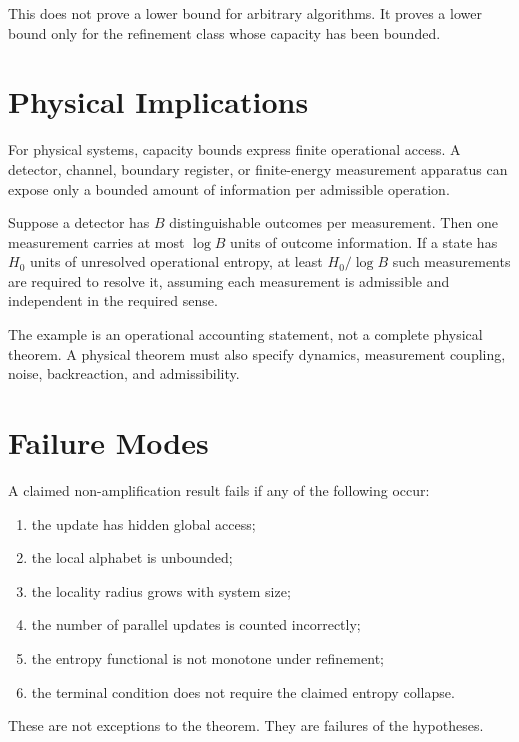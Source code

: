 This does not prove a lower bound for arbitrary algorithms. It proves a lower
bound only for the refinement class whose capacity has been bounded.

\section{Physical Implications}

For physical systems, capacity bounds express finite operational access. A
detector, channel, boundary register, or finite-energy measurement apparatus
can expose only a bounded amount of information per admissible operation.

\begin{example}
Suppose a detector has \(B\) distinguishable outcomes per measurement. Then
one measurement carries at most \(\log B\) units of outcome information. If a
state has \(H_0\) units of unresolved operational entropy, at least
\(H_0/\log B\) such measurements are required to resolve it, assuming each
measurement is admissible and independent in the required sense.
\end{example}

The example is an operational accounting statement, not a complete physical
theorem. A physical theorem must also specify dynamics, measurement coupling,
noise, backreaction, and admissibility.

\section{Failure Modes}

A claimed non-amplification result fails if any of the following occur:

\begin{enumerate}
\item the update has hidden global access;
\item the local alphabet is unbounded;
\item the locality radius grows with system size;
\item the number of parallel updates is counted incorrectly;
\item the entropy functional is not monotone under refinement;
\item the terminal condition does not require the claimed entropy collapse.
\end{enumerate}

These are not exceptions to the theorem. They are failures of the hypotheses.

